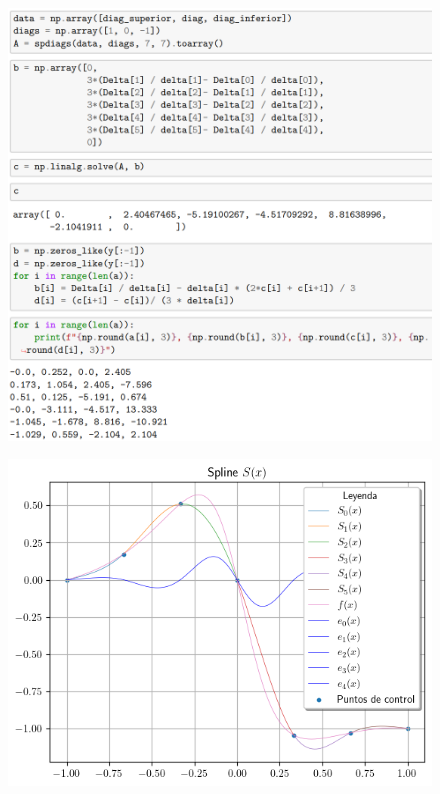 \begin{frame}
    \begin{solution}
        \begin{figure}[ht!]
            \centering
            \includegraphics[width=.55\paperwidth]{8b}
        \end{figure}
    \end{solution}
\end{frame}

\begin{frame}
    \begin{solution}
        \begin{figure}[ht!]
            \centering
            \includegraphics[width=.65\paperwidth]{8}
        \end{figure}
    \end{solution}
\end{frame}
